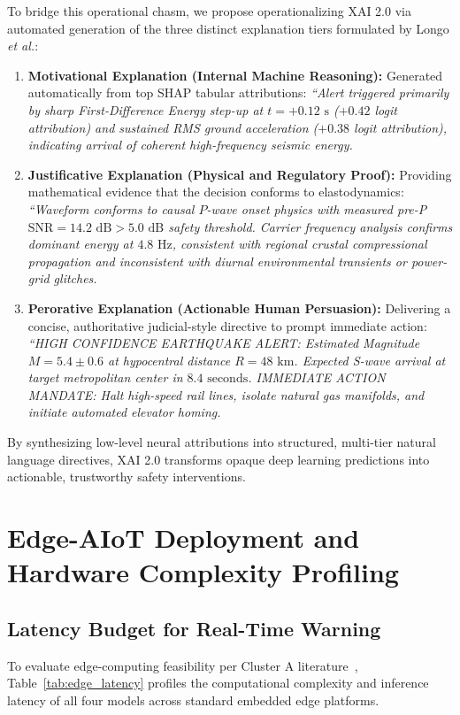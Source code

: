 \documentclass[journal]{IEEEtran}
\begin{document}
To bridge this operational chasm, we propose operationalizing XAI 2.0 via automated generation of the three distinct explanation tiers formulated by Longo \textit{et al.}:
\begin{enumerate}
    \item \textbf{Motivational Explanation (Internal Machine Reasoning):} Generated automatically from top SHAP tabular attributions: \textit{``Alert triggered primarily by sharp First-Difference Energy step-up at $t = +0.12\text{ s}$ ($+0.42$ logit attribution) and sustained RMS ground acceleration ($+0.38$ logit attribution), indicating arrival of coherent high-frequency seismic energy.}
    \item \textbf{Justificative Explanation (Physical and Regulatory Proof):} Providing mathematical evidence that the decision conforms to elastodynamics: \textit{``Waveform conforms to causal $P$-wave onset physics with measured pre-P $\text{SNR} = 14.2\text{ dB} > 5.0\text{ dB}$ safety threshold. Carrier frequency analysis confirms dominant energy at $4.8\text{ Hz}$, consistent with regional crustal compressional propagation and inconsistent with diurnal environmental transients or power-grid glitches.}
    \item \textbf{Perorative Explanation (Actionable Human Persuasion):} Delivering a concise, authoritative judicial-style directive to prompt immediate action: \textit{``HIGH CONFIDENCE EARTHQUAKE ALERT: Estimated Magnitude $M = 5.4 \pm 0.6$ at hypocentral distance $R = 48\text{ km}$. Expected S-wave arrival at target metropolitan center in $8.4\text{ seconds}$. IMMEDIATE ACTION MANDATE: Halt high-speed rail lines, isolate natural gas manifolds, and initiate automated elevator homing.}
\end{enumerate}
By synthesizing low-level neural attributions into structured, multi-tier natural language directives, XAI 2.0 transforms opaque deep learning predictions into actionable, trustworthy safety interventions.


\section{Edge-AIoT Deployment and Hardware Complexity Profiling}

\subsection{Latency Budget for Real-Time Warning}
To evaluate edge-computing feasibility per Cluster A literature~\cite{esposito2025aiot, ahamad2025deep}, Table~\ref{tab:edge_latency} profiles the computational complexity and inference latency of all four models across standard embedded edge platforms.
\end{document}

